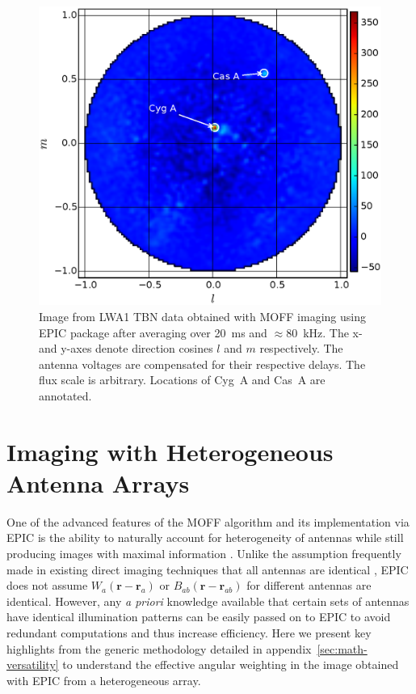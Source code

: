 \documentclass[a4paper,fleqn,usenatbib]{mnras}
\begin{document}
\begin{figure}
  \includegraphics[width=\columnwidth]{figure9}
  \caption{Image from LWA1 TBN data obtained with MOFF imaging using EPIC package after averaging over 20~ms and $\approx 80$~kHz. The x- and y-axes denote direction cosines $l$ and $m$ respectively. The antenna voltages are compensated for their respective delays. The flux scale is arbitrary. Locations of Cyg~A and Cas~A are annotated.}
  \label{fig:LWA-image}
\end{figure}

\section{Imaging with Heterogeneous Antenna Arrays}\label{sec:versatility}

One of the advanced features of the MOFF algorithm and its implementation via EPIC is the ability to naturally account for heterogeneity of antennas while still producing images with maximal information \citep{mor11}. Unlike the assumption frequently made in existing direct imaging techniques that all antennas are identical \citep{oto94,dai00,teg09,teg10,fos14,zhe14}, EPIC does not assume $W_a(\mathbf{r}-\mathbf{r}_a)$ or $B_{ab}(\mathbf{r}-\mathbf{r}_{ab})$ for different antennas are identical. However, any {\it a priori} knowledge available that certain sets of antennas have identical illumination patterns can be easily passed on to EPIC to avoid redundant computations and thus increase efficiency. Here we present key highlights from the generic methodology detailed in appendix~\ref{sec:math-versatility} to understand the effective angular weighting in the image obtained with EPIC from a heterogeneous array. 
\end{document}
